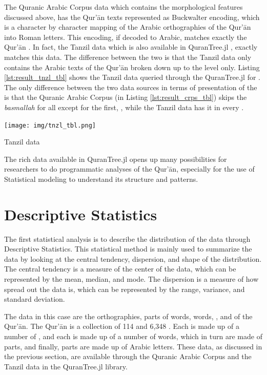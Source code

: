 The Quranic Arabic Corpus data which contains the morphological features discussed above, has the Qur'\=an texts represented as Buckwalter encoding, which is a character by character mapping of the Arabic orthographies of the Qur'\=an into Roman letters. This encoding, if decoded to Arabic, matches exactly the Qur'\=an  . In fact, the Tanzil data which is also available in QuranTree.jl \cite{asaad2021qurantree}, exactly matches this data. The difference between the two is that the Tanzil data only contains the Arabic texts of the Qur'\=an broken down up to the   level only. Listing \ref{lst:result_tnzl_tbl} shows the Tanzil data queried through the QuranTree.jl \cite{asaad2021qurantree} for  . The only difference between the two data sources in terms of presentation of the   is that the Quranic Arabic Corpus (in Listing \ref{lst:result_crps_tbl}) skips the \textit{basmallah} for all   except for the first,  , while the Tanzil data has it in every  .

\begin{listing2}[!t]
    \centering
    \texttt{[image: img/tnzl\_tbl.png]}
    \caption{  Tanzil data}
    \label{lst:result_tnzl_tbl}
\end{listing2}

The rich data available in QuranTree.jl \cite{asaad2021qurantree} opens up many possibilities for researchers to do programmatic analyses of the Qur'\=an, especially for the use of Statistical modeling to understand its structure and patterns.
\section{Descriptive Statistics}\label{sec:ch4_desc_stat}
The first statistical analysis is to describe the distribution of the data through Descriptive Statistics. This statistical method is mainly used to summarize the data by looking at the central tendency, dispersion, and shape of the distribution. The central tendency is a measure of the center of the data, which can be represented by the mean, median, and mode. The dispersion is a measure of how spread out the data is, which can be represented by the range, variance, and standard deviation.

The data in this case are the orthographies, parts of words, words,  , and   of the Qur'\=an. The Qur'\=an is a collection of 114   and 6,348  . Each   is made up of a number of  , and each   is made up of a number of words, which in turn are made of parts, and finally, parts are made up of Arabic letters. These data, as discussed in the previous section, are available through the Quranic Arabic Corpus and the Tanzil data in the QuranTree.jl library.

